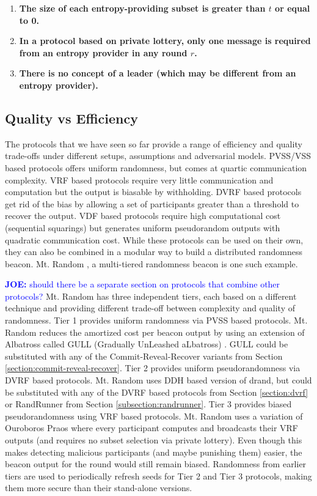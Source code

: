 \documentclass[letterpaper,twocolumn,10pt]{article}
\theoremstyle{definition}
\theoremstyle{remark}
\newcommand{\joenote}[1]{\textcolor{blue}{\textbf{JOE:} #1}}
\begin{document}
\begin{enumerate}
\item \textbf{The size of each entropy-providing subset is greater than $t$ or equal to 0.}
\item \textbf{In a protocol based on private lottery, only one message is required from an entropy provider in any round $r$.}
\item \textbf{There is no concept of a leader (which may be different from an entropy provider).}
\end{enumerate}

\subsection{Quality vs Efficiency}
The protocols that we have seen so far provide a range of efficiency and quality trade-offs under different setups, assumptions and adversarial models. PVSS/VSS based protocols offers uniform randomness, but comes at  quartic communication complexity. 
VRF based protocols require very little communication and computation but the output is biasable by withholding. DVRF based protocols get rid of the bias by allowing a set of participants greater than a threshold to recover the output. VDF based protocols require high computational cost (sequential squarings) but generates uniform pseudorandom outputs with quadratic communication cost. While these protocols can be used on their own, they can also be combined in a modular way to build a distributed randomness beacon. Mt. Random \cite{cascudomt}, a multi-tiered randomness beacon is one such example.

\joenote{should there be a separate section on protocols that combine other protocols?}
Mt. Random has three independent tiers, each based on a different technique and providing different trade-off between complexity and quality of randomness. Tier 1 provides uniform randomness via PVSS based protocols. Mt. Random reduces the amortized cost per beacon output by using an extension of Albatross called GULL (Gradually UnLeashed aLbatross) \cite{cascudomt}. GULL could be substituted with any of the Commit-Reveal-Recover variants from Section \ref{section:commit-reveal-recover}. Tier 2 provides uniform pseudorandomness via DVRF based protocols. Mt. Random uses DDH based version of drand, but could be substituted with any of the DVRF based protocols from Section \ref{section:dvrf} or RandRunner from Section \ref{subsection:randrunner}. Tier 3 provides biased pseudorandomness using VRF based protocols. Mt. Random uses a variation of Ouroboros Praos where every participant computes and broadcasts their VRF outputs (and requires no subset selection via private lottery). Even though this makes detecting malicious participants (and maybe punishing them) easier, the beacon output for the round would still remain biased. Randomness from earlier tiers are used to periodically refresh seeds for Tier 2 and Tier 3 protocols, making them more secure than their stand-alone versions.
\end{document}
